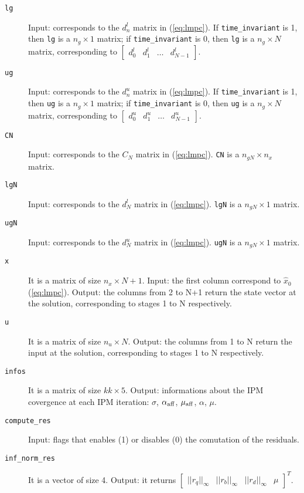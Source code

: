 \documentclass[a4paper]{report}
\begin{document}
\begin{description}
\item[\tt lg] Input: corresponds to the $d^l_n$ matrix in (\ref{eq:lmpc}).
If {\tt time\_invariant} is 1, then {\tt lg} is a $n_g\times 1$ matrix; if {\tt time\_invariant} is 0, then {\tt lg} is a $n_g\times N$ matrix, corresponding to $\begin{bmatrix} d^l_0 & d^l_1 & \dots & d^l_{N-1} \end{bmatrix}$.

\item[\tt ug] Input: corresponds to the $d^u_n$ matrix in (\ref{eq:lmpc}).
If {\tt time\_invariant} is 1, then {\tt ug} is a $n_g\times 1$ matrix; if {\tt time\_invariant} is 0, then {\tt ug} is a $n_g\times N$ matrix, corresponding to $\begin{bmatrix} d^u_0 & d^u_1 & \dots & d^u_{N-1} \end{bmatrix}$.

\item[\tt CN] Input: corresponds to the $C_N$ matrix in (\ref{eq:lmpc}).
{\tt CN} is a $n_{gN}\times n_x$ matrix.

\item[\tt lgN] Input: corresponds to the $d^l_N$ matrix in (\ref{eq:lmpc}).
{\tt lgN} is a $n_{gN}\times 1$ matrix.

\item[\tt ugN] Input: corresponds to the $d^u_N$ matrix in (\ref{eq:lmpc}).
{\tt ugN} is a $n_{gN}\times 1$ matrix.

\item[\tt x] It is a matrix of size $n_x \times N+1$.
Input: the first column correspond to $\hat x_0$ (\ref{eq:lmpc}).
Output: the columns from 2 to N+1 return the state vector at the solution, corresponding to stages 1 to N respectively.

\item[\tt u] It is a matrix of size $n_u \times N$.
Output: the columns from 1 to N return the input at the solution, corresponding to stages 1 to N respectively.

\item[\tt infos] It is a matrix of size $kk \times 5$.
Output: informations about the IPM covergence at each IPM iteration: $\sigma$, $\alpha_{\rm aff}$, $\mu_{\rm aff}$, $\alpha$, $\mu$.

\item[\tt compute\_res] Input: flags that enables (1) or disables (0) the comutation of the residuals.

\item[\tt inf\_norm\_res] It is a vector of size 4.
Output: it returns $\begin{bmatrix} ||r_q||_\infty & ||r_b||_\infty & ||r_d||_\infty & \mu \end{bmatrix}^T$.


\end{description}
\end{document}

